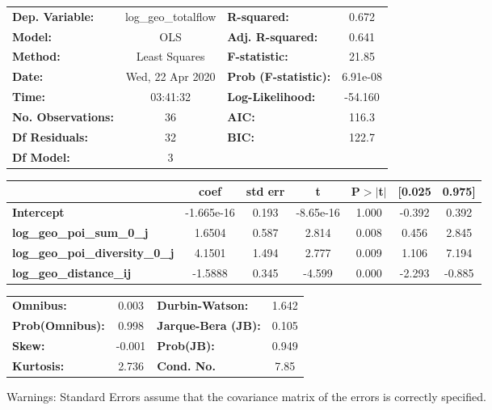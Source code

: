 \begin{center}
\begin{tabular}{lclc}
\toprule
\textbf{Dep. Variable:}                 & log\_geo\_totalflow & \textbf{  R-squared:         } &     0.672   \\
\textbf{Model:}                         &         OLS         & \textbf{  Adj. R-squared:    } &     0.641   \\
\textbf{Method:}                        &    Least Squares    & \textbf{  F-statistic:       } &     21.85   \\
\textbf{Date:}                          &   Wed, 22 Apr 2020  & \textbf{  Prob (F-statistic):} &  6.91e-08   \\
\textbf{Time:}                          &       03:41:32      & \textbf{  Log-Likelihood:    } &   -54.160   \\
\textbf{No. Observations:}              &            36       & \textbf{  AIC:               } &     116.3   \\
\textbf{Df Residuals:}                  &            32       & \textbf{  BIC:               } &     122.7   \\
\textbf{Df Model:}                      &             3       & \textbf{                     } &             \\
\bottomrule
\end{tabular}
\begin{tabular}{lcccccc}
                                        & \textbf{coef} & \textbf{std err} & \textbf{t} & \textbf{P$> |$t$|$} & \textbf{[0.025} & \textbf{0.975]}  \\
\midrule
\textbf{Intercept}                      &   -1.665e-16  &        0.193     & -8.65e-16  &         1.000        &       -0.392    &        0.392     \\
\textbf{log\_geo\_poi\_sum\_0\_j}       &       1.6504  &        0.587     &     2.814  &         0.008        &        0.456    &        2.845     \\
\textbf{log\_geo\_poi\_diversity\_0\_j} &       4.1501  &        1.494     &     2.777  &         0.009        &        1.106    &        7.194     \\
\textbf{log\_geo\_distance\_ij}         &      -1.5888  &        0.345     &    -4.599  &         0.000        &       -2.293    &       -0.885     \\
\bottomrule
\end{tabular}
\begin{tabular}{lclc}
\textbf{Omnibus:}       &  0.003 & \textbf{  Durbin-Watson:     } &    1.642  \\
\textbf{Prob(Omnibus):} &  0.998 & \textbf{  Jarque-Bera (JB):  } &    0.105  \\
\textbf{Skew:}          & -0.001 & \textbf{  Prob(JB):          } &    0.949  \\
\textbf{Kurtosis:}      &  2.736 & \textbf{  Cond. No.          } &     7.85  \\
\bottomrule
\end{tabular}
\end{center}

Warnings: \newline
 [1] Standard Errors assume that the covariance matrix of the errors is correctly specified.